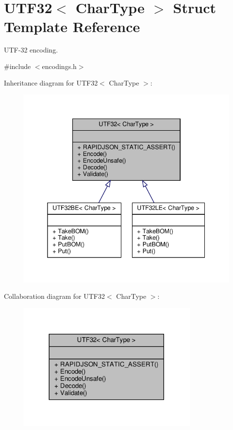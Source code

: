 \hypertarget{structUTF32}{}\section{U\+T\+F32$<$ Char\+Type $>$ Struct Template Reference}
\label{structUTF32}


U\+T\+F-\/32 encoding.  




{\ttfamily \#include $<$encodings.\+h$>$}



Inheritance diagram for U\+T\+F32$<$ Char\+Type $>$\+:
\nopagebreak
\begin{figure}[H]
\begin{center}
\leavevmode
\includegraphics[width=338pt]{structUTF32__inherit__graph}
\end{center}
\end{figure}


Collaboration diagram for U\+T\+F32$<$ Char\+Type $>$\+:
\nopagebreak
\begin{figure}[H]
\begin{center}
\leavevmode
\includegraphics[width=257pt]{structUTF32__coll__graph}
\end{center}
\end{figure}
